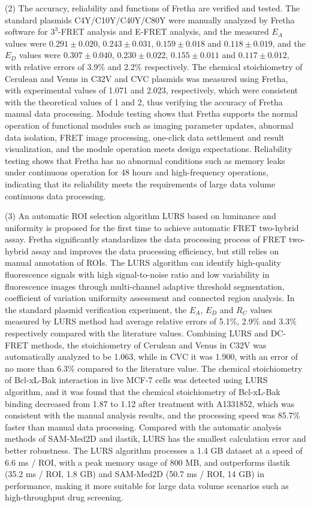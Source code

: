 \begin{eabstract}
(2) The accuracy, reliability and functions of Fretha are verified and tested.
The standard plasmids C4Y/C10Y/C40Y/C80Y were manually analyzed by Fretha software for $3^3$-FRET analysis and E-FRET analysis, and the measured $E_{A}$ values were $0.291\pm0.020$, $0.243\pm0.031$, $0.159\pm0.018$ and $0.118\pm0.019$, and the $E_{D}$ values were $0.307\pm0.040$, $0.230\pm0.022$, $0.155\pm0.011$ and $0.117\pm0.012$, with relative errors of 3.9\% and 2.2\% respectively.
The chemical stoichiometry of Cerulean and Venus in C32V and CVC plasmids was measured using Fretha, with experimental values of 1.071 and 2.023, respectively, which were consistent with the theoretical values of 1 and 2, thus verifying the accuracy of Fretha manual data processing.
Module testing shows that Fretha supports the normal operation of functional modules such as imaging parameter updates, abnormal data isolation, FRET image processing, one-click data settlement and result visualization, and the module operation meets design expectations.
Reliability testing shows that Fretha has no abnormal conditions such as memory leaks under continuous operation for 48 hours and high-frequency operations, indicating that its reliability meets the requirements of large data volume continuous data processing.

(3) An automatic ROI selection algorithm LURS based on luminance and uniformity is proposed for the first time to achieve automatic FRET two-hybrid assay.
Fretha significantly standardizes the data processing process of FRET two-hybrid assay and improves the data processing efficiency, but still relies on manual annotation of ROIs.
The LURS algorithm can identify high-quality fluorescence signals with high signal-to-noise ratio and low variability in fluorescence images through multi-channel adaptive threshold segmentation, coefficient of variation uniformity assessment and connected region analysis.
In the standard plasmid verification experiment, the $E_{A}$, $E_{D}$ and $R_C$ values measured by LURS method had average relative errors of 5.1\%, 2.9\% and 3.3\% respectively compared with the literature values.
Combining LURS and DC-FRET methods, the stoichiometry of Cerulean and Venus in C32V was automatically analyzed to be 1.063, while in CVC it was 1.900, with an error of no more than 6.3\% compared to the literature value.
The chemical stoichiometry of Bcl-xL-Bak interaction in live MCF-7 cells was detected using LURS algorithm, and it was found that the chemical stoichiometry of Bcl-xL-Bak binding decreased from 1.87 to 1.12 after treatment with A1331852, which was consistent with the manual analysis results, and the processing speed was 85.7\% faster than manual data processing.
Compared with the automatic analysis methods of SAM-Med2D and ilastik, LURS has the smallest calculation error and better robustness.
The LURS algorithm processes a 1.4 GB dataset at a speed of 6.6 ms / ROI, with a peak memory usage of 800 MB, and outperforms ilastik (35.2 ms / ROI, 1.8 GB) and SAM-Med2D (50.7 ms / ROI, 14 GB) in performance, making it more suitable for large data volume scenarios such as high-throughput drug screening.


\end{eabstract}
